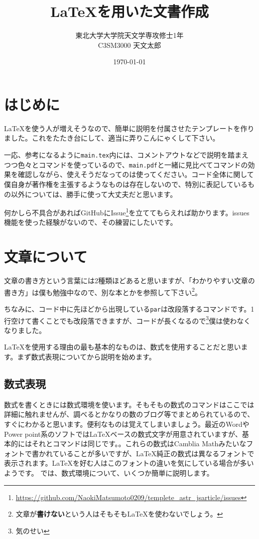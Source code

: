 \documentclass[a4paper,papersize,uplatex,dvipdfmx,10pt]{jsarticle}
\title{\vspace{-3cm}\LaTeX{}を用いた文書作成} %
\author{東北大学大学院天文学専攻修士1年\\C3SM3000\,\,天文太郎}
\date{\today}
\newcommand{\bs}{\symbol{92}} %
\begin{document}
\maketitle

\nocite{*}

\section{はじめに} %
\LaTeX{}を使う人が増えそうなので、簡単に説明を付属させたテンプレートを作りました。これをたたき台にして、適当に弄りこんにゃくして下さい。\par
一応、参考になるように\texttt{main.tex}内には、コメントアウトなどで説明を踏まえつつ色々とコマンドを使っているので、\texttt{main.pdf}と一緒に見比べてコマンドの効果を確認しながら、使えそうだなってのは使ってください。コード全体に関して僕自身が著作権を主張するようなものは存在しないので、特別に表記しているもの以外については、勝手に使って大丈夫だと思います。\par
何かしら不具合があればGitHubにIssue\footnote{\url{https://github.com/NaokiMatsumoto0209/templete_astr_jsarticle/issues}}を立ててもらえれば助かります。issues機能を使った経験がないので、その練習にしたいです。

\section{文章について} %
文章の書き方という言葉には2種類ほどあると思いますが、「わかりやすい文章の書き方」は僕も勉強中なので、別な本とかを参照して下さい\footnote{文章が\textbf{書けない}という人はそもそも\LaTeX{}を使わないでしょう。}。\par
ちなみに、コード中に先ほどから出現している\texttt{\bs par}は改段落するコマンドです。1行空けて書くことでも改段落できますが、コードが長くなるので\footnote{気のせい}僕は使わなくなりました。\par
\LaTeX{}を使用する理由の最も基本的なものは、数式を使用することだと思います。まず数式表現についてから説明を始めます。

\subsection{数式表現} %
数式を書くときには数式環境を使います。そもそもの数式のコマンドはここでは詳細に触れませんが、調べるとかなりの数のブログ等でまとめられているので、すぐにわかると思います。便利なものは覚えてしまいましょう。最近のWordやPower point系のソフトでは\LaTeX{}ベースの数式文字が用意されていますが、基本的にはそれとコマンドは同じです。。これらの数式はCamblia Mathみたいなフォントで書かれていることが多いですが、\LaTeX{}純正の数式は異なるフォントで表示されます。\LaTeX{}を好む人はこのフォントの違いを気にしている場合が多いようです。
では、数式環境について、いくつか簡単に説明します。
\end{document}
